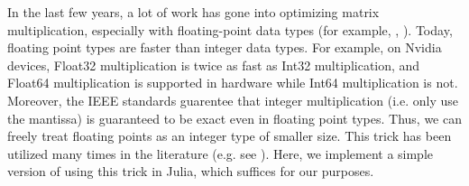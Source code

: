 





In the last few years, a lot of work has gone into optimizing matrix multiplication,
especially with floating-point data types
(for example, \cite{nvidia-2024-cublas}, \cite{openblas-2024-openblas}). 
Today, floating point types are faster than
integer data types.
For example, on Nvidia devices, Float32 multiplication
is twice as fast as Int32 multiplication, and Float64
multiplication is supported in hardware while Int64 multiplication
is not.
Moreover, the IEEE standards guarentee that integer multiplication (i.e. only use the mantissa) 
is guaranteed to be exact even in floating point types. 
Thus, we can freely treat floating points as an integer type of smaller size.
This trick has been utilized many times in the literature (e.g. see \cite{bglm-2024-matmul-modp}).
Here, we implement a simple version of using this trick in Julia,
which suffices for our purposes.

